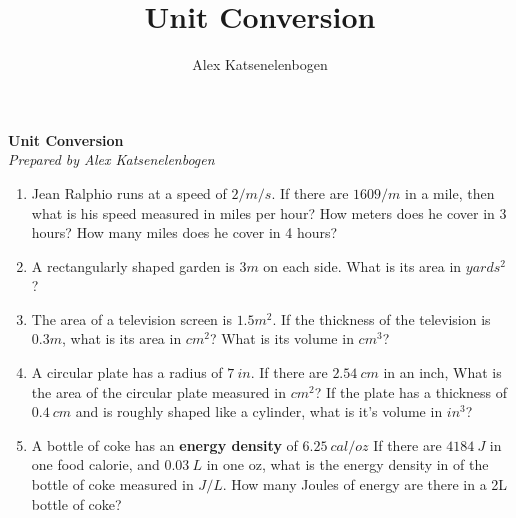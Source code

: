 \documentclass{article}
\title{Unit Conversion}
\author{Alex Katsenelenbogen}
\begin{document}
\begin{center}
      \Large\textbf{Unit Conversion}\\
      \large\textit{Prepared by Alex Katsenelenbogen}
   \end{center}

\begin{enumerate}

\item Jean Ralphio runs at a speed of $2/ m/s$. If there are $1609/ m$ in a mile, then what is his speed measured in miles per hour? How meters does he cover in 3 hours? How many miles does he cover in 4 hours?

\item A rectangularly shaped garden is $3m$ on each side. What is its area in $yards^2$?

\item The area of a television screen is $1.5 m^2$. If the thickness of the television is $0.3m$, what is its area in $cm^2$? What is its volume in $cm^3$?

\item A circular plate has a radius of $7\ in$. If there are $2.54\ cm$ in an inch, What is the area of the circular plate measured in $cm^2$? If the plate has a thickness of $0.4\ cm$ and is roughly shaped like a cylinder, what is it's volume 
in $in^3$?

\item A bottle of coke has an \textbf{energy density} of $6.25\ cal/oz$ If there are $4184\ J$ in one food calorie, and $0.03\ L$ in one oz, what is the energy density in of the bottle of coke measured in $J/L$. How many Joules of energy are there in a 2L bottle of coke?

\end{enumerate}
\end{document}
